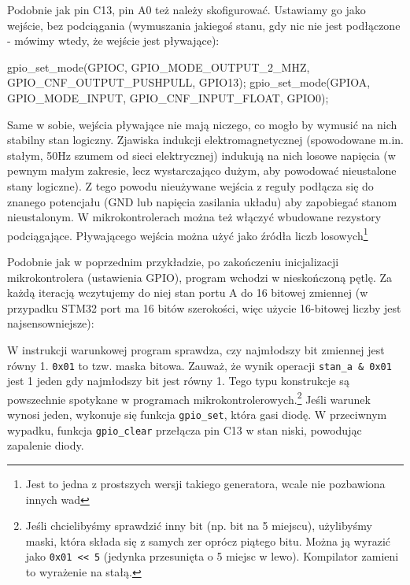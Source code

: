 \documentclass{pdfBooklets}
\begin{document}
Podobnie jak pin C13, pin A0 też należy skofigurować\footnotemark. Ustawiamy go jako wejście, bez podciągania
(wymuszania jakiegoś stanu, gdy nic nie jest podłączone - mówimy wtedy, że wejście jest pływające):

\begin{CodeFrame*}[c]{}
  gpio_set_mode(GPIOC, GPIO_MODE_OUTPUT_2_MHZ, GPIO_CNF_OUTPUT_PUSHPULL, GPIO13);
  gpio_set_mode(GPIOA, GPIO_MODE_INPUT, GPIO_CNF_INPUT_FLOAT, GPIO0);
\end{CodeFrame*}


Same w sobie, wejścia pływające nie mają niczego, co mogło by wymusić na nich stabilny stan logiczny. Zjawiska indukcji
elektromagnetycznej (spowodowane m.in. stałym, 50Hz szumem od sieci elektrycznej) indukują na nich losowe napięcia
(w pewnym małym zakresie, lecz wystarczająco dużym, aby powodować nieustalone stany logiczne). Z tego powodu
nieużywane wejścia z reguły podłącza się do znanego potencjału (GND lub napięcia zasilania układu) aby zapobiegać
stanom nieustalonym. W mikrokontrolerach można też włączyć wbudowane rezystory podciągające.
%
Pływającego wejścia można użyć jako źródła liczb losowych\footnote{Jest to jedna z prostszych wersji takiego
  generatora, wcale nie pozbawiona innych wad}

Podobnie jak w poprzednim przykładzie, po zakończeniu inicjalizacji mikrokontrolera (ustawienia GPIO), program
wchodzi w nieskończoną pętlę. Za każdą iteracją wczytujemy do niej stan portu A do 16 bitowej zmiennej
(w przypadku STM32 port ma 16 bitów szerokości, więc użycie 16-bitowej liczby jest najsensowniejsze):

\begin{CodeFrame*}[c]{}
  int16_t stan_a;

  while(1){
    stan_a = gpio_port_read(GPIOA);
\end{CodeFrame*}

W instrukcji warunkowej program sprawdza, czy najmłodszy bit zmiennej jest równy 1. \texttt{0x01} to tzw. maska bitowa.
Zauważ, że wynik operacji \texttt{\Verb$stan_a & 0x01$} jest 1 jeden gdy najmłodszy bit jest równy 1. Tego typu
konstrukcje są powszechnie spotykane w programach mikrokontrolerowych.\footnote{
	Jeśli chcielibyśmy sprawdzić inny bit (np. bit na 5 miejscu), użylibyśmy maski, która składa się z samych zer oprócz piątego bitu.
	Można ją wyrazić jako \Verb$0x01 << 5$ (jedynka przesunięta o 5 miejsc w lewo). Kompilator zamieni to wyrażenie na stałą.
}
Jeśli warunek wynosi jeden, wykonuje się funkcja \Verb$gpio_set$, która gasi diodę. W przeciwnym wypadku, funkcja
\Verb$gpio_clear$ przełącza pin C13 w stan niski, powodując zapalenie diody.
\end{document}
